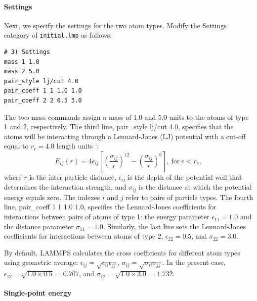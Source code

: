 \documentclass[9pt,tutorial]{livecoms}
\newcommand{\lmpcmd}[1]{\hspace{0pt}\colorbox{listing}{\textcolor{command}{\small{#1}}}\hspace{0pt}} %
\newcommand{\flecmd}[1]{\textcolor{command}{\texttt{#1}}} %
\begin{document}
\paragraph{Settings}

Next, we specify the settings for the two atom types.  Modify the
\lmpcmd{Settings} category of \flecmd{initial.lmp} as follows:
\begin{lstlisting}
# 3) Settings
mass 1 1.0
mass 2 5.0
pair_style lj/cut 4.0
pair_coeff 1 1 1.0 1.0
pair_coeff 2 2 0.5 3.0
\end{lstlisting}
The two \lmpcmd{mass} commands assign a mass of 1.0 and 5.0 units to the
atoms of type 1 and 2, respectively.  The third line,
\lmpcmd{pair\_style lj/cut 4.0}, specifies that the atoms will be
interacting through a Lennard-Jones (LJ) potential with a cut-off equal
to $r_c = 4.0$ length units~\cite{wang2020lennard,fischer2023history}:
\begin{equation}
E_{ij} (r) = 4 \epsilon_{ij} \left[ \left( \dfrac{\sigma_{ij}}{r} \right)^{12}
  - \left( \dfrac{\sigma_{ij}}{r} \right)^{6} \right], ~ \text{for} ~ r < r_c,
\label{eq:LJ}
\end{equation}
where $r$ is the inter-particle distance, $\epsilon_{ij}$ is
the depth of the potential well that determines the interaction strength, and
$\sigma_{ij}$ is the distance at which the potential energy equals zero.
The indexes $i$ and $j$ refer to pairs of particle types.
The fourth line, \lmpcmd{pair\_coeff 1 1 1.0 1.0}, specifies the
Lennard-Jones coefficients for interactions between pairs of atoms
of type 1: the energy parameter $\epsilon_{11} = 1.0$ and
the distance parameter $\sigma_{11} = 1.0$.  Similarly, the last line
sets the Lennard-Jones coefficients for interactions between atoms
of type 2, $\epsilon_{22} = 0.5$, and $\sigma_{22} = 3.0$.

\begin{note}
By default, LAMMPS calculates the cross coefficients for different atom
types using geometric average: $\epsilon_{ij} = \sqrt{\epsilon_{ii} \epsilon_{jj}}$,
$\sigma_{ij} = \sqrt{\sigma_{ii} \sigma_{jj}}$.  In the present case,
$\epsilon_{12} = \sqrt{1.0 \times 0.5} = 0.707$, and
$\sigma_{12} = \sqrt{1.0 \times 3.0} = 1.732$.
\end{note}

\paragraph{Single-point energy}
\end{document}
